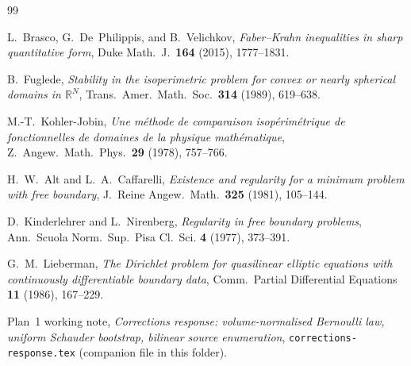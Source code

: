 \documentclass[11pt]{amsart}
\theoremstyle{definition}
\newcommand{\R}{\mathbb R}
\begin{document}
\begin{thebibliography}{99}

 L.~Brasco, G.~De~Philippis, and B.~Velichkov,
\emph{Faber--Krahn inequalities in sharp quantitative form},
Duke Math.~J.\ \textbf{164} (2015), 1777--1831.

 B.~Fuglede, \emph{Stability in the
isoperimetric problem for convex or nearly spherical domains in
$\R^N$}, Trans.~Amer.~Math.~Soc.\ \textbf{314} (1989), 619--638.

 M.-T.~Kohler-Jobin, \emph{Une m\'ethode de
comparaison isop\'erim\'etrique de fonctionnelles de domaines de la
physique math\'ematique},
Z.~Angew.~Math.~Phys.\ \textbf{29} (1978), 757--766.

 H.~W.~Alt and L.~A.~Caffarelli, \emph{Existence and
regularity for a minimum problem with free boundary},
J.~Reine Angew.~Math.\ \textbf{325} (1981), 105--144.

 D.~Kinderlehrer and L.~Nirenberg, \emph{Regularity in
free boundary problems}, Ann.~Scuola Norm.~Sup.~Pisa Cl.~Sci.
\textbf{4} (1977), 373--391.

 G.~M.~Lieberman, \emph{The Dirichlet problem for
quasilinear elliptic equations with continuously differentiable
boundary data}, Comm.~Partial Differential Equations \textbf{11}
(1986), 167--229.

 Plan~1 working note,
\emph{Corrections response: volume-normalised Bernoulli law, uniform
Schauder bootstrap, bilinear source enumeration},
\texttt{corrections-response.tex} (companion file in this folder).

\end{thebibliography}
\end{document}
